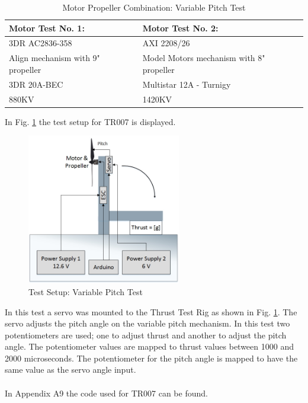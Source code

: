 \begin {table}[H]
    \begin{center}
    \caption {Motor Propeller Combination: Variable Pitch Test} 
    \label{tab:tabt9} 
    \begin{tabular}{|l|l|}\hline 
        Motor Test No. 1: & Motor Test No. 2:  \\ \hline
        3DR AC2836-358  & AXI 2208/26 \\ \hline
        Align mechanism with 9" propeller & Model Motors mechanism with 8" propeller \\ \hline
        3DR 20A-BEC & Multistar 12A - Turnigy \\ \hline
        880KV & 1420KV \\ \hline
        \end{tabular}
    \end{center}
\end{table}
\newpage
\noindent In Fig. \ref{fig:VPM} the test setup for TR007 is displayed.
\begin{figure}[H]
    \centering
    \includegraphics[width = 0.6\textwidth]{VAPIQ-PICTURES/TestSetup7}
    \caption{Test Setup: Variable Pitch Test}
    \label{fig:VPM}
\end{figure}
\noindent
In this test a servo was mounted to the Thrust Test Rig as shown in Fig. \ref{fig:VPM}. The servo adjusts the pitch angle on the variable pitch mechanism. In this test two potentiometers are used; one to adjust thrust and another to adjust the pitch angle. The potentiometer values are mapped to thrust values between 1000 and 2000 microseconds. The potentiometer for the pitch angle is mapped to have the same value as the servo angle input.\\
\\
In Appendix A9 the code used for TR007 can be found. 


